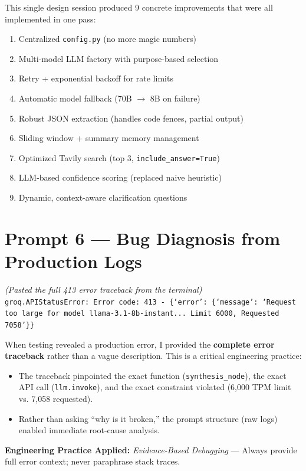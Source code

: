 \documentclass[12pt, a4paper]{article}
\begin{document}
\begin{impactbox}
This single design session produced 9 concrete improvements that were all implemented in one pass:
\begin{enumerate}
    \item Centralized \texttt{config.py} (no more magic numbers)
    \item Multi-model LLM factory with purpose-based selection
    \item Retry + exponential backoff for rate limits
    \item Automatic model fallback (70B $\to$ 8B on failure)
    \item Robust JSON extraction (handles code fences, partial output)
    \item Sliding window + summary memory management
    \item Optimized Tavily search (top 3, \texttt{include\_answer=True})
    \item LLM-based confidence scoring (replaced naive heuristic)
    \item Dynamic, context-aware clarification questions
\end{enumerate}
\end{impactbox}

\section{Prompt 6 — Bug Diagnosis from Production Logs}

\begin{promptbox}
\textit{(Pasted the full 413 error traceback from the terminal)}\\[4pt]
\texttt{groq.APIStatusError: Error code: 413 - \{`error': \{`message': `Request too large for model llama-3.1-8b-instant... Limit 6000, Requested 7058'\}\}}
\end{promptbox}

\begin{reasonbox}
When testing revealed a production error, I provided the \textbf{complete error traceback} rather than a vague description. This is a critical engineering practice:

\begin{itemize}[leftmargin=1.5em]
    \item The traceback pinpointed the exact function (\texttt{synthesis\_node}), the exact API call (\texttt{llm.invoke}), and the exact constraint violated (6,000 TPM limit vs. 7,058 requested).
    \item Rather than asking ``why is it broken,'' the prompt structure (raw logs) enabled immediate root-cause analysis.
\end{itemize}

\textbf{Engineering Practice Applied:} \textit{Evidence-Based Debugging} — Always provide full error context; never paraphrase stack traces.
\end{reasonbox}
\end{document}
